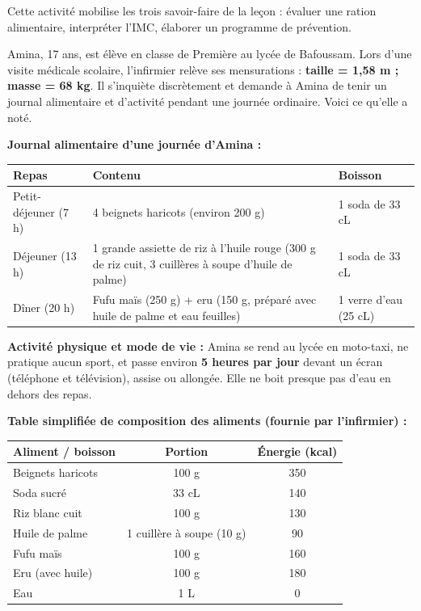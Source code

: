 \documentclass[11pt]{article}
\newcounter{popsec}
\newcounter{popsub}
\newcommand{\courssub}[1]{%
  \stepcounter{popsub}%
  \par\vspace{9pt}\noindent{\popxbold\fontsize{11.5}{13}\selectfont\color{popink}{\color{poporange}\thepopsec.\thepopsub}\hspace{6pt}#1}\par\nopagebreak\vspace{4pt}
}
\begin{document}
Cette activité mobilise les trois savoir-faire de la leçon : évaluer une ration alimentaire, interpréter l'IMC, élaborer un programme de prévention.

\courssub{Situation}

Amina, 17 ans, est élève en classe de Première au lycée de Bafoussam. Lors d'une visite médicale scolaire, l'infirmier relève ses mensurations : \textbf{taille = 1,58 m ; masse = 68 kg}. Il s'inquiète discrètement et demande à Amina de tenir un journal alimentaire et d'activité pendant une journée ordinaire. Voici ce qu'elle a noté.

\textbf{Journal alimentaire d'une journée d'Amina :}

\begin{center}
\begin{tabularx}{\linewidth}{|l|X|l|}
\hline
\rowcolor{popblueL} \textbf{Repas} & \textbf{Contenu} & \textbf{Boisson} \\
\hline
Petit-déjeuner (7 h) & 4 beignets haricots (environ 200 g) & 1 soda de 33 cL \\
\hline
Déjeuner (13 h) & 1 grande assiette de riz à l'huile rouge (300 g de riz cuit, 3 cuillères à soupe d'huile de palme) & 1 soda de 33 cL \\
\hline
Dîner (20 h) & Fufu maïs (250 g) + eru (150 g, préparé avec huile de palme et eau feuilles) & 1 verre d'eau (25 cL) \\
\hline
\end{tabularx}
\end{center}

\textbf{Activité physique et mode de vie :} Amina se rend au lycée en moto-taxi, ne pratique aucun sport, et passe environ \textbf{5 heures par jour} devant un écran (téléphone et télévision), assise ou allongée. Elle ne boit presque pas d'eau en dehors des repas.

\textbf{Table simplifiée de composition des aliments (fournie par l'infirmier) :}

\begin{center}
\begin{tabularx}{\linewidth}{|X|c|c|}
\hline
\rowcolor{popblueL} \textbf{Aliment / boisson} & \textbf{Portion} & \textbf{Énergie (kcal)} \\
\hline
Beignets haricots & 100 g & 350 \\
\hline
Soda sucré & 33 cL & 140 \\
\hline
Riz blanc cuit & 100 g & 130 \\
\hline
Huile de palme & 1 cuillère à soupe (10 g) & 90 \\
\hline
Fufu maïs & 100 g & 160 \\
\hline
Eru (avec huile) & 100 g & 180 \\
\hline
Eau & 1 L & 0 \\
\hline
\end{tabularx}
\end{center}
\end{document}
